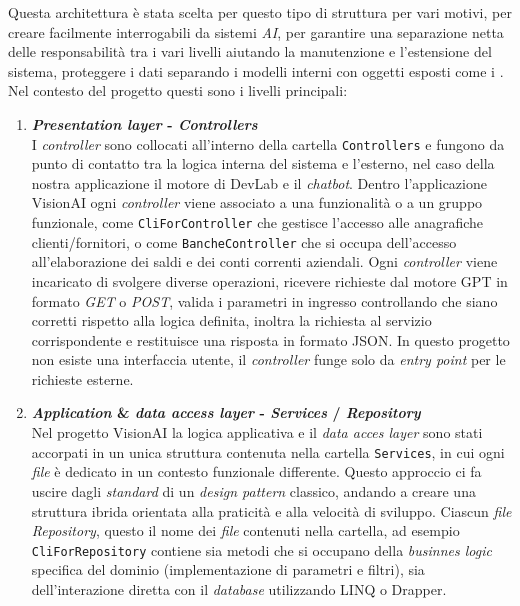 Questa architettura è stata scelta per questo tipo di struttura per vari motivi, per creare   facilmente interrogabili da sistemi \textit{AI}, per garantire una separazione netta delle responsabilità tra i vari livelli aiutando la manutenzione e l'estensione del sistema, proteggere i dati separando i modelli interni con oggetti esposti come i .
Nel contesto del progetto questi sono i livelli principali:
\begin{enumerate}
    \item \textbf{\textit{Presentation layer} - \textit{Controllers}}\\
    I \textit{controller} sono collocati all'interno della cartella \texttt{Controllers} e fungono da punto di contatto tra la logica interna del sistema e l'esterno, nel caso della nostra applicazione il motore di DevLab e il \textit{chatbot}.
    Dentro l'applicazione VisionAI ogni \textit{controller} viene associato a una funzionalità o a un gruppo funzionale, come \texttt{CliForController} che gestisce l'accesso alle anagrafiche clienti/fornitori, o come \texttt{BancheController} che si occupa dell'accesso all'elaborazione dei saldi e dei conti correnti aziendali.
    Ogni \textit{controller} viene incaricato di svolgere diverse operazioni, ricevere richieste  dal motore GPT in formato \textit{GET} o \textit{POST}, valida i parametri in ingresso controllando che siano corretti rispetto alla logica definita, inoltra la richiesta al servizio corrispondente e restituisce una risposta in formato JSON. In questo progetto non esiste una interfaccia utente, il \textit{controller} funge solo da \textit{entry point} per le richieste esterne.
    \item \textbf{\textit{Application} \& \textit{data access layer} - \textit{Services} / \textit{Repository}}\\
    Nel progetto VisionAI la logica applicativa e il \textit{data acces layer} sono stati accorpati in un unica struttura contenuta nella cartella \texttt{Services}, in cui ogni \textit{file} è dedicato in un contesto funzionale differente. Questo approccio ci fa uscire dagli \textit{standard} di un \textit{design pattern} classico, andando a creare una struttura ibrida orientata alla praticità e alla velocità di sviluppo. 
    Ciascun \textit{file} \textit{Repository}, questo il nome dei \textit{file} contenuti nella cartella, ad esempio \texttt{CliForRepository} contiene sia metodi che si occupano della \textit{businnes logic} specifica del dominio (implementazione di parametri e filtri), sia dell'interazione diretta con il \textit{database} utilizzando LINQ o Drapper.

\end{enumerate}

